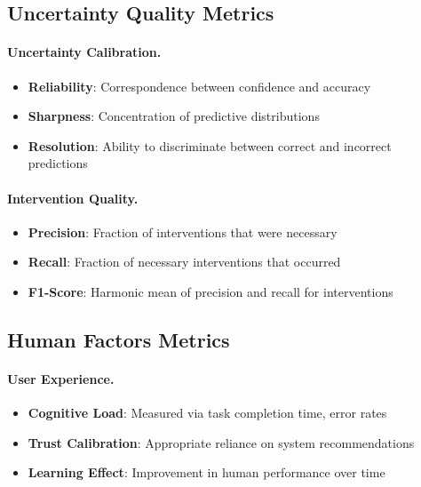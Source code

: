 \subsection{Uncertainty Quality Metrics}

\paragraph{Uncertainty Calibration.}
\begin{itemize}
    \item \textbf{Reliability}: Correspondence between confidence and accuracy
    \item \textbf{Sharpness}: Concentration of predictive distributions
    \item \textbf{Resolution}: Ability to discriminate between correct and incorrect predictions
\end{itemize}

\paragraph{Intervention Quality.}
\begin{itemize}
    \item \textbf{Precision}: Fraction of interventions that were necessary
    \item \textbf{Recall}: Fraction of necessary interventions that occurred
    \item \textbf{F1-Score}: Harmonic mean of precision and recall for interventions
\end{itemize}

\subsection{Human Factors Metrics}

\paragraph{User Experience.}
\begin{itemize}
    \item \textbf{Cognitive Load}: Measured via task completion time, error rates
    \item \textbf{Trust Calibration}: Appropriate reliance on system recommendations
    \item \textbf{Learning Effect}: Improvement in human performance over time
\end{itemize}

